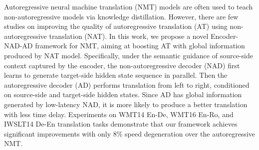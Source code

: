 Autoregressive neural machine translation (NMT) models are often used to teach non-autoregressive models via knowledge distillation. However, there are few studies on improving the quality of autoregressive translation (AT) using non-autoregressive translation (NAT). In this work, we propose a novel Encoder-NAD-AD framework for NMT, aiming at boosting AT with global information produced by NAT model. Specifically, under the semantic guidance of source-side context captured by the encoder, the non-autoregressive decoder (NAD) first learns to generate target-side hidden state sequence in parallel. Then the autoregressive decoder (AD) performs translation from left to right, conditioned on source-side and target-side hidden states.  Since AD has global information generated by low-latency NAD, it is more likely to produce a better translation with less time delay. Experiments on WMT14 En-De, WMT16 En-Ro, and IWSLT14 De-En translation tasks demonstrate that our framework achieves significant improvements with only 8\% speed degeneration over the autoregressive NMT.
